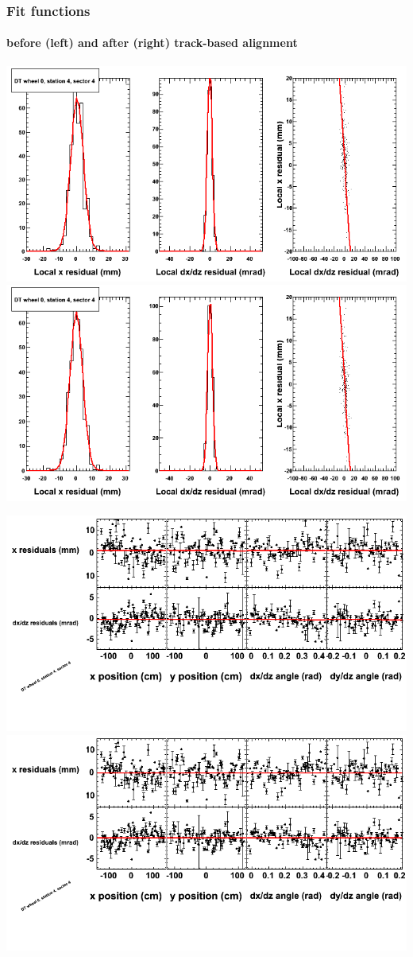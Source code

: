 \documentclass[compress]{beamer}
\begin{document}
\begin{frame}
\frametitle{Fit functions}
\framesubtitle{before (left) and after (right) track-based alignment}
\includegraphics[width=0.5\linewidth]{fitfunctions_re01/MBwhCst4sec04_bellcurves.png} \includegraphics[width=0.5\linewidth]{fitfunctions_re05/MBwhCst4sec04_bellcurves.png}

\includegraphics[width=0.5\linewidth]{fitfunctions_re01/MBwhCst4sec04_polynomials.png} \includegraphics[width=0.5\linewidth]{fitfunctions_re05/MBwhCst4sec04_polynomials.png}
\end{frame}
\end{document}
